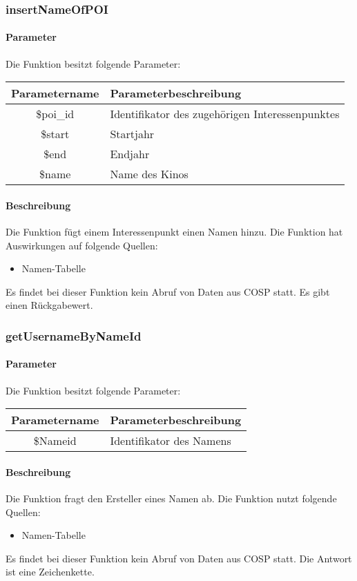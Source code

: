 \subsubsection{insertNameOfPOI}
\paragraph{Parameter} Die Funktion besitzt folgende Parameter:
\begin{table}[H]
	\begin{tabular}{|c|p{11cm}|}
		\hline
		\textbf{Parametername} & \textbf{Parameterbeschreibung} \\ \hline
		\$poi\_id & Identifikator des zugehörigen Interessenpunktes \\ \hline
		\$start   & Startjahr \\ \hline
		\$end     & Endjahr \\ \hline
		\$name    & Name des Kinos \\ \hline
	\end{tabular}
\end{table}
\paragraph{Beschreibung} Die Funktion fügt einem Interessenpunkt einen Namen hinzu. Die Funktion hat Auswirkungen auf folgende Quellen:
\begin{itemize}
	\item Namen-Tabelle
\end{itemize}
Es findet bei dieser Funktion kein Abruf von Daten aus {\glqq COSP\grqq} statt. Es gibt einen Rückgabewert.
\subsubsection{getUsernameByNameId}
\paragraph{Parameter} Die Funktion besitzt folgende Parameter:
\begin{table}[H]
	\begin{tabular}{|c|p{11cm}|}
		\hline
		\textbf{Parametername} & \textbf{Parameterbeschreibung} \\ \hline
		\$Nameid & Identifikator des Namens \\ \hline
	\end{tabular}
\end{table}
\paragraph{Beschreibung} Die Funktion fragt den Ersteller eines Namen ab. Die Funktion nutzt folgende Quellen:
\begin{itemize}
	\item Namen-Tabelle
\end{itemize}
Es findet bei dieser Funktion kein Abruf von Daten aus {\glqq COSP\grqq} statt. Die Antwort ist eine Zeichenkette.
